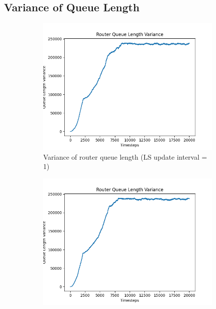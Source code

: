 \begin{appendices}
\section{Variance of Queue Length}
    \begin{figure}[H]
        \centering
        \begin{subfigure}[b]{0.475\textwidth}
            \centering
            \includegraphics[width=\textwidth]{figs/appendix/variance_ls=1.png}
            \caption[]{Variance of router queue length (LS update interval = 1)}
            \label{fig:qvar-1}
        \end{subfigure}
        \hfill
        \begin{subfigure}[b]{0.475\textwidth}
            \centering
            \includegraphics[width=\textwidth]{figs/appendix/variance_ls=10.png}

\end{subfigure}
\end{figure}
\end{appendices}
